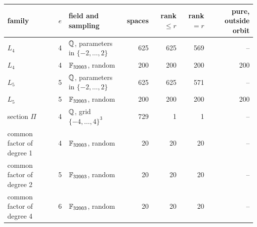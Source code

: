 \begin{tabular}{@{}lrlrrrr@{}}
\toprule
family & $e$ & field and sampling & spaces & rank $\le r$ & rank $=r$ & pure, outside orbit\\
\midrule
$L_4$ & 4 & $\mathbb{Q}$, parameters in $\{-2,\dots,2\}$ & 625 & 625 & 569 & --\\
$L_4$ & 4 & $\mathbb{F}_{32003}$, random & 200 & 200 & 200 & 200\\
$L_5$ & 5 & $\mathbb{Q}$, parameters in $\{-2,\dots,2\}$ & 625 & 625 & 571 & --\\
$L_5$ & 5 & $\mathbb{F}_{32003}$, random & 200 & 200 & 200 & 200\\
section $\Pi$ & 4 & $\mathbb{Q}$, grid $\{-4,\dots,4\}^3$ & 729 & 1 & 1 & --\\
common factor of degree 1 & 4 & $\mathbb{F}_{32003}$, random & 20 & 20 & 20 & --\\
common factor of degree 2 & 5 & $\mathbb{F}_{32003}$, random & 20 & 20 & 20 & --\\
common factor of degree 4 & 6 & $\mathbb{F}_{32003}$, random & 20 & 20 & 20 & --\\
\bottomrule
\end{tabular}
